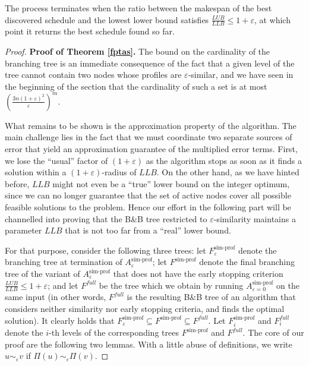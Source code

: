 \documentclass[moor,sglanonrev]{informs4}
\theoremstyle{plain}
\begin{document}
The process terminates when the ratio between the makespan of the best discovered schedule and the lowest lower bound satisfies $\frac{LUB}{LLB} \le 1+ \varepsilon$, at which point it returns the best schedule found so far.

\begin{proof}{\textbf{Proof of Theorem \ref{fptas}.}}
    The bound on the cardinality of the branching tree is an immediate consequence of the fact that a given level of the tree cannot contain two nodes whose profiles are $\varepsilon$-similar, and we have seen in the beginning of the section that the cardinality of such a set is at most $\left( \frac{3n(1+\varepsilon)^2}{\varepsilon}\right)^m$.

    What remains to be shown is the approximation property of the algorithm. The main challenge lies in the fact that we must coordinate two separate sources of error that yield an approximation guarantee of the multiplied error terms. First, we lose the ``usual'' factor of $(1+\varepsilon)$ as the algorithm stops as soon as it finds a solution within a $(1+\varepsilon)$-radius of $LLB$. On the other hand, as we have hinted before, $LLB$ might not even be a ``true'' lower bound on the integer optimum, since we can no longer guarantee that the set of active nodes cover all possible feasible solutions to the problem. Hence our effort in the following part will be channelled into proving that the B\&B tree restricted to $\varepsilon$-similarity maintains a parameter $LLB$ that is not too far from a ``real'' lower bound.
    
    For that purpose, consider the following three trees: let $F^{\text{sim-prof}}_{\varepsilon}$ denote the branching tree at termination of $A^{\text{sim-prof}}_{\varepsilon}$; let $F^{\text{sim-prof}}$ denote the final branching tree of the variant of $A^{\text{sim-prof}}_{\varepsilon}$ that does not have the early stopping criterion $\frac{LUB}{LLB}\le 1+\varepsilon$; and let $F^{full}$ be the tree which we obtain by running $A^{\text{sim-prof}}_{\varepsilon=0}$ on the same input (in other words, $F^{full}$ is the resulting B\&B tree of an algorithm that considers neither similarity nor early stopping criteria, and finds the optimal solution). It clearly holds that $F^{\text{sim-prof}}_{\varepsilon} \subseteq F^{\text{sim-prof}} \subseteq F^{full}$. Let $F^{\text{sim-prof}}_i$ and $F^{full}_i$ denote the $i$-th levels of the corresponding trees $F^{\text{sim-prof}}$ and $F^{full}$. The core of our proof are the following two lemmas. With a little abuse of definitions, we write $u \sim_{\varepsilon} v$ if $\Pi(u) \sim_{\varepsilon} \Pi(v)$.


\end{proof}
\end{document}
